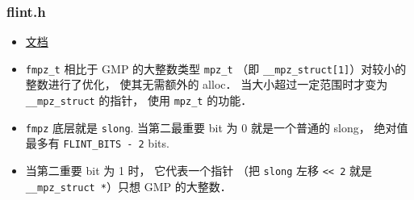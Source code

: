
\begin{issues}
\issueDraft
\end{issues}


\subsubsection{flint.h}
\begin{itemize}
\item \href{http://flintlib.org/sphinx/fmpz.html}{文档}
\item \verb|fmpz_t| 相比于 GMP 的大整数类型 \verb|mpz_t| （即 \verb|__mpz_struct[1]|）对较小的整数进行了优化， 使其无需额外的 alloc． 当大小超过一定范围时才变为 \verb|__mpz_struct| 的指针， 使用 \verb|mpz_t| 的功能．
\item \verb|fmpz| 底层就是 \verb|slong|. 当第二最重要 bit 为 0 就是一个普通的 slong， 绝对值最多有 \verb|FLINT_BITS - 2| bits.
\item 当第二重要 bit 为 1 时， 它代表一个指针 （把 \verb|slong| 左移 \verb|<< 2| 就是 \verb|__mpz_struct *|）只想 GMP 的大整数．
\end{itemize}
